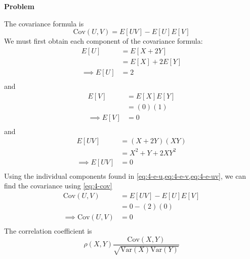 \documentclass[12pt]{article}
\newenvironment{Ex}{\textbf{Problem}\vspace{.75em}\\}{}
\begin{document}
\begin{enumerate}
\begin{Ex}
\begin{solution}
      The covariance formula is
      \begin{equation}
        \label{eq:4-cov}
        \text{Cov}(U,V) = E[UV] - E[U]E[V]
      \end{equation}
      We must first obtain each component of the covariance formula:
      \begin{equation}
        \label{eq:4-e-u}
        \begin{aligned}
          E[U] &= E[X+2Y] \\
          &= E[X] + 2E[Y] \\
          \implies E[U] &= 2 \\
        \end{aligned}
      \end{equation}
      and
      \begin{equation}
        \label{eq:4-e-v}
        \begin{aligned}
          E[V] &= E[X]E[Y] \\
          &= (0)(1) \\
          \implies E[V] &= 0 \\
        \end{aligned}
      \end{equation}
      and
      \begin{equation}
        \label{eq:4-e-uv}
        \begin{aligned}
          E[UV] &= (X+2Y)(XY) \\
          &= X^2+Y + 2XY^2 \\
          \implies E[UV] &= 0 \\
        \end{aligned}
      \end{equation}
      Using the individual components found in
      \cref{eq:4-e-u,eq:4-e-v,eq:4-e-uv}, we can find the covariance
      using \cref{eq:4-cov}
      \begin{equation}
        \label{eq:4-cov-plugged}
        \begin{aligned}
          \text{Cov}(U,V) &= E[UV] - E[U]E[V] \\
          &= 0 - (2)(0) \\
          \implies \text{Cov}(U,V) &= 0 \\
        \end{aligned}
      \end{equation}
      The correlation coefficient is
      \begin{equation}
        \label{eq:4-c-coef}
        \rho(X,Y) \frac{\text{Cov}(X,Y)}{\sqrt{\text{Var}(X)\text{Var}(Y)}}

\end{equation}
\end{solution}
\end{Ex}
\end{enumerate}
\end{document}
